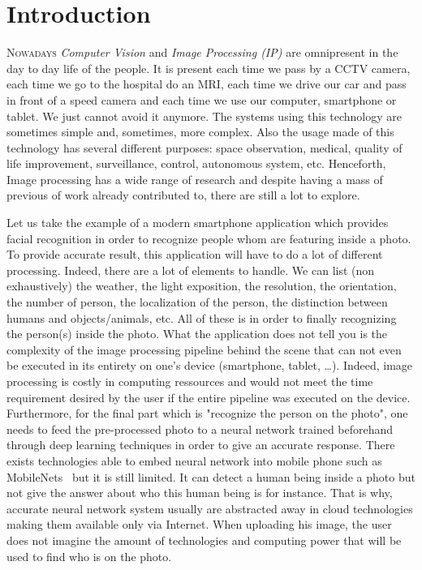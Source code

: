 \chapter*{Introduction}
\label{introduction.chap.introduction}

\lettrine[lines=2]{N}{owadays} \emph{Computer Vision} and \emph{Image Processing (IP)} are omnipresent in the day to day
life of the people. It is present each time we pass by a CCTV camera, each time we go to the hospital do an MRI, each
time we drive our car and pass in front of a speed camera and each time we use our computer, smartphone or tablet. We
just cannot avoid it anymore. The systems using this technology are sometimes simple and, sometimes, more complex. Also
the usage made of this technology has several different purposes: space observation, medical, quality of life
improvement, surveillance, control, autonomous system, etc. Henceforth, Image processing has a wide range of research
and despite having a mass of previous of work already contributed to, there are still a lot to explore.

Let us take the example of a modern smartphone application which provides facial recognition in order to recognize
people whom are featuring inside a photo. To provide accurate result, this application will have to do a lot of
different processing. Indeed, there are a lot of elements to handle. We can list (non exhaustively) the weather, the
light exposition, the resolution, the orientation, the number of person, the localization of the person, the distinction
between humans and objects/animals, etc. All of these is in order to finally recognizing the person(s) inside the photo.
What the application does not tell you is the complexity of the image processing pipeline behind the scene that can not
even be executed in its entirety on one's device (smartphone, tablet, \ldots). Indeed, image processing is costly in
computing ressources and would not meet the time requirement desired by the user if the entire pipeline was executed on
the device. Furthermore, for the final part which is "recognize the person on the photo", one needs to feed the
pre-processed photo to a neural network trained beforehand through deep learning techniques in order to give an accurate
response. There exists technologies able to embed neural network into mobile phone such as
MobileNets~\parencite{howard.2017.mobilenets} but it is still limited. It can detect a human being inside a photo but
not give the answer about who this human being is for instance. That is why, accurate neural network system usually are
abstracted away in cloud technologies making them available only via Internet. When uploading his image, the user does
not imagine the amount of technologies and computing power that will be used to find who is on the photo.

